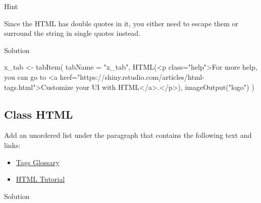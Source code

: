 \documentclass[
]{book}
\newenvironment{Shaded}{\begin{snugshade}}{\end{snugshade}}
\newcommand{\AttributeTok}[1]{\textcolor[rgb]{0.77,0.63,0.00}{#1}}
\newcommand{\FunctionTok}[1]{\textcolor[rgb]{0.00,0.00,0.00}{#1}}
\newcommand{\NormalTok}[1]{#1}
\newcommand{\OtherTok}[1]{\textcolor[rgb]{0.56,0.35,0.01}{#1}}
\newcommand{\SpecialCharTok}[1]{\textcolor[rgb]{0.00,0.00,0.00}{#1}}
\newcommand{\StringTok}[1]{\textcolor[rgb]{0.31,0.60,0.02}{#1}}
\providecommand{\tightlist}{%
  \setlength{\itemsep}{0pt}\setlength{\parskip}{0pt}}
\begin{document}
Hint

Since the HTML has double quotes in it, you either need to escape them or surround the string in single quotes instead.

Solution

\begin{Shaded}
\begin{Highlighting}[]
\NormalTok{x\_tab }\OtherTok{\textless{}{-}} \FunctionTok{tabItem}\NormalTok{(}
    \AttributeTok{tabName =} \StringTok{"x\_tab"}\NormalTok{,}
    \FunctionTok{HTML}\NormalTok{(}\StringTok{\textquotesingle{}\textless{}p class="help"\textgreater{}For more help, you can go to \textless{}a href="https://shiny.rstudio.com/articles/html{-}tags.html"\textgreater{}Customize your UI with HTML\textless{}/a\textgreater{}.\textless{}/p\textgreater{}\textquotesingle{}}\NormalTok{),}
    \FunctionTok{imageOutput}\NormalTok{(}\StringTok{"logo"}\NormalTok{)}
\NormalTok{)}
\end{Highlighting}
\end{Shaded}

\hypertarget{class-html}{%
\subsection{Class HTML}\label{class-html}}

Add an unordered list under the paragraph that contains the following text and links:

\begin{itemize}
\tightlist
\item
  \href{https://shiny.rstudio.com/articles/tag-glossary.html}{Tags Glossary}
\item
  \href{https://www.w3schools.com/html/}{HTML Tutorial}
\end{itemize}

Solution

\begin{Shaded}
\end{Shaded}
\end{document}
